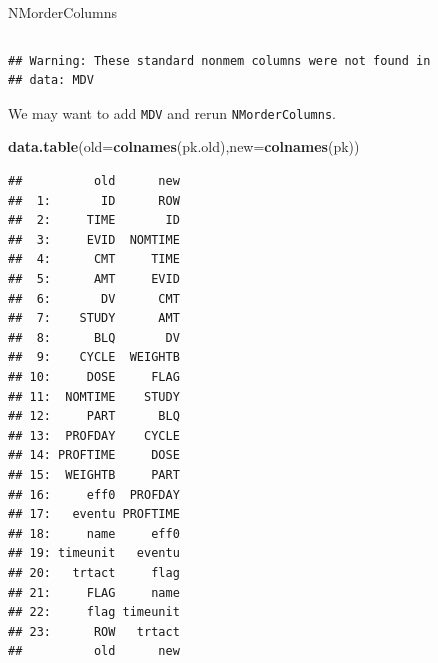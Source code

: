 \documentclass[
  8pt,
  ignorenonframetext,
  aspectratio=169]{beamer}
\newenvironment{Shaded}{\begin{snugshade}}{\end{snugshade}}
\newcommand{\DataTypeTok}[1]{\textcolor[rgb]{0.13,0.29,0.53}{#1}}
\newcommand{\KeywordTok}[1]{\textcolor[rgb]{0.13,0.29,0.53}{\textbf{#1}}}
\newcommand{\NormalTok}[1]{#1}
\begin{document}
\begin{frame}[fragile]{NMorderColumns}
\begin{columns}[T]
\begin{column}{0.48\textwidth}
\begin{verbatim}
## Warning: These standard nonmem columns were not found in
## data: MDV
\end{verbatim}

\normalsize

We may want to add \texttt{MDV} and rerun \texttt{NMorderColumns}.
\footnotesize

\begin{Shaded}
\begin{Highlighting}[]
\KeywordTok{data.table}\NormalTok{(}\DataTypeTok{old=}\KeywordTok{colnames}\NormalTok{(pk.old),}\DataTypeTok{new=}\KeywordTok{colnames}\NormalTok{(pk))}
\end{Highlighting}
\end{Shaded}

\begin{verbatim}
##          old      new
##  1:       ID      ROW
##  2:     TIME       ID
##  3:     EVID  NOMTIME
##  4:      CMT     TIME
##  5:      AMT     EVID
##  6:       DV      CMT
##  7:    STUDY      AMT
##  8:      BLQ       DV
##  9:    CYCLE  WEIGHTB
## 10:     DOSE     FLAG
## 11:  NOMTIME    STUDY
## 12:     PART      BLQ
## 13:  PROFDAY    CYCLE
## 14: PROFTIME     DOSE
## 15:  WEIGHTB     PART
## 16:     eff0  PROFDAY
## 17:   eventu PROFTIME
## 18:     name     eff0
## 19: timeunit   eventu
## 20:   trtact     flag
## 21:     FLAG     name
## 22:     flag timeunit
## 23:      ROW   trtact
##          old      new
\end{verbatim}
\end{column}

\normalsize
\end{columns}
\end{frame}
\end{document}
